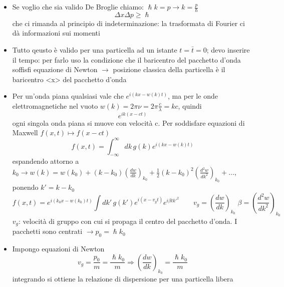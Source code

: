 \begin{itemize}
\begin{equation*}
    \end{equation*}
    \item Se voglio che sia valido De Broglie chiamo: $\hslash k = p \rightarrow k = \frac{p}{\hslash}$
    \begin{equation*}
        \Delta x \Delta p \geq \hslash
    \end{equation*}
    che ci rimanda al principio di indeterminazione: la trasformata di Fourier ci dà informazioni sui momenti
    \item Tutto qeusto è valido per una particella ad un istante $t = \bar{t} = 0$; devo inserire il tempo: per farlo uso la condizione che il baricentro del pacchetto d'onda soffisfi equazione di Newton $\rightarrow$ posizione classica della particella è il baricentro <x> del pacchetto d'onda
    \item Per un'onda piana qualsiasi vale che $e^{i(kx - w(k)t)}$, ma per le onde elettromagnetiche nel vuoto $w(k) = 2\pi \nu = 2\pi \frac{c}{\lambda} = kc$, quindi
    \begin{equation*}
        e^{ik(x-ct)}
    \end{equation*}
    ogni singola onda piana si muove con velocità c. Per soddisfare equazioni di Maxwell $f(x,t) \mapsto f(x-ct)$
    \begin{equation*}
        f(x,t) = \int_{-\infty}^\infty dk \, g(k) e^{i(kx-w(k)t)}
    \end{equation*}
    espandendo attorno a $k_0 \rightarrow w(k)= w(k_0) + (k-k_0)\left(\frac{dw}{dk}\right)_{k_0} + \frac{1}{2} {(k-k_0)}^2 \left(\frac{d^2w}{dk^2}\right)_{k_0} + \dots $, ponendo $k' = k -k_0$
    \begin{equation*}
        f(x,t) = e^{i(k_0x - w(k_0)t)} \int dk' \, g(k')e^{i(x-v_gt)}e^{i\beta t k'^2} \qquad v_g = \left(\frac{dw}{dk}\right)_{k_0} \; \beta = \left(\frac{d^2w}{dk^2}\right)_{k_0}
    \end{equation*}
    $v_g$: velocità di gruppo con cui si propaga il centro del pacchetto d'onda. \newline
    I pacchetti sono centrati $\rightarrow p_0 = \hslash k_0$
    \item Impongo equazioni di Newton
    \begin{equation*}
        v_g = \frac{p_0}{m} = \frac{\hslash k_0}{m} \Rightarrow \left(\frac{dw}{dk}\right)_{k_0} = \frac{\hslash k_0}{m}
    \end{equation*}
    integrando si ottiene la relazione di dispersione per una particella libera
    \begin{equation*}

\end{equation*}
\end{itemize}
